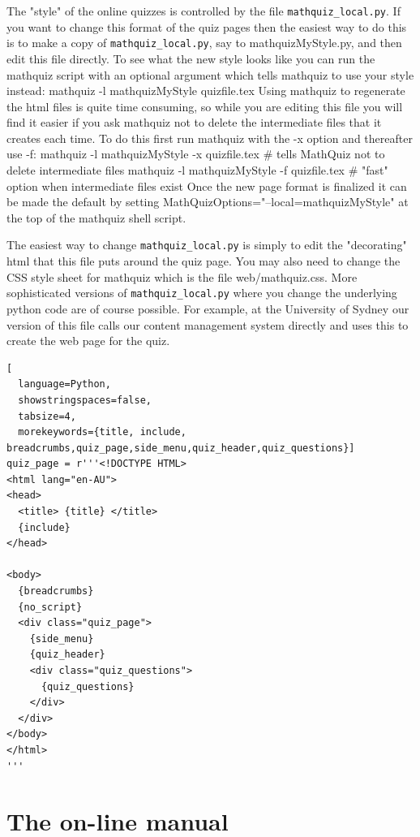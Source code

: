 \documentclass[svgnames]{article}
\begin{document}
  The "style" of the online quizzes is controlled by the file
  \verb!mathquiz_local.py!. If you want to change this format of the quiz
  pages then the easiest way to do this is to make a copy of
  \verb!mathquiz_local.py!, say to mathquizMyStyle.py, and then edit this file
  directly. To see what the new style looks like you can run the
  mathquiz script with an optional argument which tells mathquiz to use
  your style instead: mathquiz -l mathquizMyStyle quizfile.tex Using
  mathquiz to regenerate the html files is quite time consuming, so
  while you are editing this file you will find it easier if you ask
  mathquiz not to delete the intermediate files that it creates each
  time. To do this first run mathquiz with the -x option and thereafter
  use -f: mathquiz -l mathquizMyStyle -x quizfile.tex   \# tells
  MathQuiz not to delete intermediate files mathquiz -l mathquizMyStyle
  -f quizfile.tex   \# "fast" option when intermediate files exist Once
  the new page format is finalized it can be made the default by setting
  MathQuizOptions="--local=mathquizMyStyle" at the top of the mathquiz
  shell script.

  The easiest way to change \verb!mathquiz_local.py! is simply to edit the
  "decorating" html that this file puts around the quiz page. You may
  also need to change the CSS style sheet for mathquiz which is the file
  web/mathquiz.css. More sophisticated versions of \verb!mathquiz_local.py!
  where you change the underlying python code are of course possible.
  For example, at the University of Sydney our version of this file
  calls our content management system directly and uses this to create
  the web page for the quiz.

\begin{lstlisting}[
  language=Python,
  showstringspaces=false,
  tabsize=4,
  morekeywords={title, include, breadcrumbs,quiz_page,side_menu,quiz_header,quiz_questions}]
quiz_page = r'''<!DOCTYPE HTML>
<html lang="en-AU">
<head>
  <title> {title} </title>
  {include}
</head>

<body>
  {breadcrumbs}
  {no_script}
  <div class="quiz_page">
    {side_menu}
    {quiz_header}
    <div class="quiz_questions">
      {quiz_questions}
    </div>
  </div>
</body>
</html>
'''
\end{lstlisting}




  \section{The on-line manual}
\end{document}
